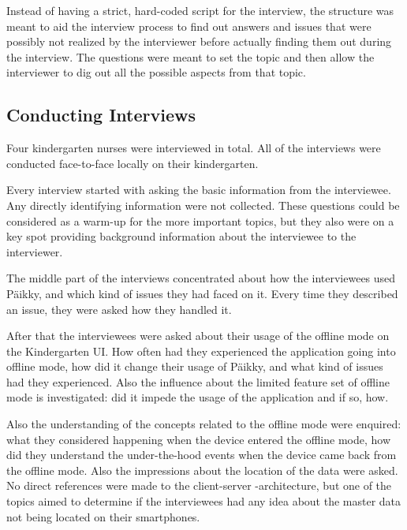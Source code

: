Instead of having a strict, hard-coded script for the interview, the structure was meant to aid the interview process to find out answers and issues that were possibly not realized by the interviewer before actually finding them out during the interview. The questions were meant to set the topic and then allow the interviewer to dig out all the possible aspects from that topic.







\subsection{Conducting Interviews}

Four kindergarten nurses were interviewed in total. All of the interviews were conducted face-to-face locally on their kindergarten. 

Every interview started with asking the basic information from the interviewee. Any directly identifying information were not collected. These questions could be considered as a warm-up for the more important topics, but they also were on a key spot providing background information about the interviewee to the interviewer. 

The middle part of the interviews concentrated about how the interviewees used Päikky, and which kind of issues they had faced on it. Every time they described an issue, they were asked how they handled it.

After that the interviewees were asked about their usage of the offline mode on the Kindergarten UI. How often had they experienced the application going into offline mode, how did it change their usage of Päikky, and what kind of issues had they experienced. Also the influence about the limited feature set of offline mode is investigated: did it impede the usage of the application and if so, how.

Also the understanding of the concepts related to the offline mode were enquired: what they considered happening when the device entered the offline mode, how did they understand the under-the-hood events when the device came back from the offline mode. Also the impressions about the location of the data were asked. No direct references were made to the client-server -architecture, but one of the topics aimed to determine if the interviewees had any idea about the master data not being located on their smartphones.

